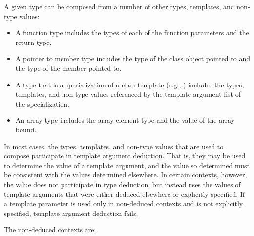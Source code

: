 \pnum
A given type
can be composed from a number of other
types, templates, and non-type values:

\begin{itemize}
\item
A function type includes the types of each of the function parameters
and the return type.
\item
A pointer to member type includes the type of the class object pointed to
and the type of the member pointed to.
\item
A type that is a specialization of a class template (e.g.,
)
includes the types, templates, and non-type values referenced by the
template argument list of the specialization.
\item
An array type includes the array element type and the value of the
array bound.
\end{itemize}

\pnum
In most cases, the types, templates, and non-type values that are used
to compose
participate in template argument deduction.
That is,
they may be used to determine the value of a template argument, and
the value so determined must be consistent with the values determined
elsewhere.
In certain contexts, however, the value does not
participate in type deduction, but instead uses the values of template
arguments that were either deduced elsewhere or explicitly specified.
If a template parameter is used only in non-deduced contexts and is not
explicitly specified, template argument deduction fails.

\pnum
The non-deduced contexts are:

